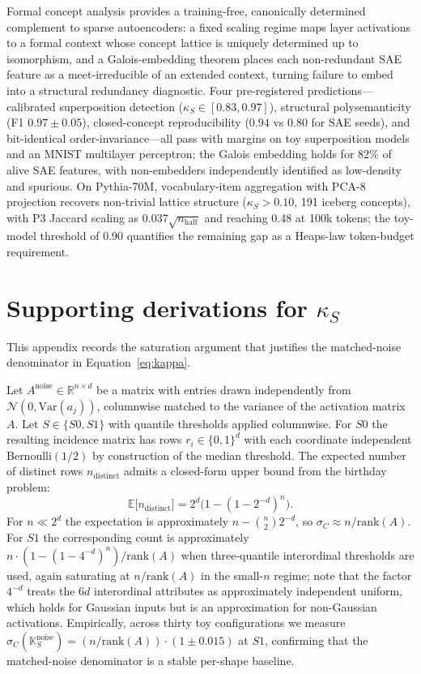 \documentclass[a4paper,fleqn]{cas-dc}
\newcommand{\R}{\mathbb{R}}
\newcommand{\K}{\mathbb{K}}
\newcommand{\sigC}{\sigma_C}
\newcommand{\kS}{\kappa_S}
\begin{document}
Formal concept analysis provides a training-free, canonically determined complement to sparse autoencoders: a fixed scaling regime maps layer activations to a formal context whose concept lattice is uniquely determined up to isomorphism, and a Galois-embedding theorem places each non-redundant SAE feature as a meet-irreducible of an extended context, turning failure to embed into a structural redundancy diagnostic.
Four pre-registered predictions---calibrated superposition detection ($\kS \in [0.83, 0.97]$), structural polysemanticity (F1 $0.97 \pm 0.05$), closed-concept reproducibility ($0.94$ vs $0.80$ for SAE seeds), and bit-identical order-invariance---all pass with margins on toy superposition models and an MNIST multilayer perceptron; the Galois embedding holds for $82\%$ of alive SAE features, with non-embedders independently identified as low-density and spurious.
On Pythia-70M, vocabulary-item aggregation with PCA-8 projection recovers non-trivial lattice structure ($\kS > 0.10$, 191 iceberg concepts), with P3 Jaccard scaling as $0.037\sqrt{n_{\text{half}}}$ and reaching 0.48 at 100k tokens; the toy-model threshold of 0.90 quantifies the remaining gap as a Heaps-law token-budget requirement.

\appendix

\section{Supporting derivations for $\kS$}\label{app:proofs}

This appendix records the saturation argument that justifies the matched-noise denominator in Equation~\eqref{eq:kappa}.

Let $A^{\mathrm{noise}} \in \R^{n \times d}$ be a matrix with entries drawn independently from $\mathcal{N}(0, \mathrm{Var}(a_j))$, columnwise matched to the variance of the activation matrix $A$.
Let $S \in \{S0, S1\}$ with quantile thresholds applied columnwise.
For $S0$ the resulting incidence matrix has rows $r_i \in \{0,1\}^d$ with each coordinate independent Bernoulli$(1/2)$ by construction of the median threshold.
The expected number of distinct rows $n_{\mathrm{distinct}}$ admits a closed-form upper bound from the birthday problem:
\begin{equation}
\mathbb{E}\bigl[n_{\mathrm{distinct}}\bigr] = 2^d \bigl(1 - (1 - 2^{-d})^n\bigr).
\end{equation}
For $n \ll 2^d$ the expectation is approximately $n - \binom{n}{2} 2^{-d}$, so $\sigC \approx n / \mathrm{rank}(A)$.
For $S1$ the corresponding count is approximately $n \cdot (1 - (1 - 4^{-d})^n) / \mathrm{rank}(A)$ when three-quantile interordinal thresholds are used, again saturating at $n / \mathrm{rank}(A)$ in the small-$n$ regime; note that the factor $4^{-d}$ treats the $6d$ interordinal attributes as approximately independent uniform, which holds for Gaussian inputs but is an approximation for non-Gaussian activations.
Empirically, across thirty toy configurations we measure $\sigC(\K_S^{\mathrm{noise}}) = (n / \mathrm{rank}(A)) \cdot (1 \pm 0.015)$ at $S1$, confirming that the matched-noise denominator is a stable per-shape baseline.
\end{document}
